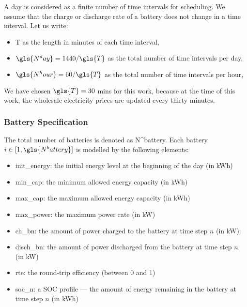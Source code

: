 A day is considered as a finite number of time intervals for scheduling. 
We assume that the charge or discharge rate of a battery does not change in a time interval. Let us write:

\begin{itemize}
	\item \gls{T} as the length in minutes of each time interval,
	
	\item $\gls{N^day} = 1440 / \gls{T}$ as the total number of time intervals per day,
	
	\item $\gls{N^hour} = 60 / \gls{T} $ as the total number of time intervals per hour,
	
\end{itemize}
We have chosen $\gls{T} = 30 $ mins for this work, because at the time of this work, the wholesale electricity prices are updated every thirty minutes. 

\subsubsection{Battery Specification}

The total number of batteries is denoted as \gls{N^battery}. Each battery $i \in [1, \gls{N^battery}]$ is modelled by the following elements:

\begin{itemize}
	\item \gls{init_energy}: the initial energy level at the beginning of the day (in kWh)
	
	\item \gls{min_cap}: the minimum allowed energy capacity (in kWh)
	
	\item \gls{max_cap}: the maximum allowed energy capacity (in kWh)
	
	\item \gls{max_power}: the maximum power rate (in kW)
	
	\item \gls{ch_bn}: the amount of power charged to the battery at time step $n$ (in kW): 
	
	\item \gls{disch_bn}: the amount of power discharged from the battery at time step $n$ (in kW) 
	
	\item \gls{rte}: the round-trip efficiency (between 0 and 1)
	
	\item \gls{soc_n}: a \gls{SOC} profile --- the amount of energy remaining in the battery at time step $n$ (in kWh)
\end{itemize}


